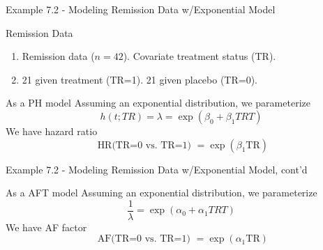 \documentclass{beamer}
\theoremstyle{definition}
\begin{document}
\begin{frame}{Example 7.2 - Modeling Remission Data w/Exponential Model}
\begin{block}{Remission Data}
\begin{enumerate}[ ]
\item Remission data ($n=42$). Covariate treatment status (TR).
\item 21 given treatment (TR=1). 21 given placebo (TR=0).
\end{enumerate}
\end{block}
\begin{block}{As a PH model}
Assuming an exponential distribution, we parameterize
\[ h(t;TR)= \lambda = \exp(\beta_0 + \beta_1 TRT)
\]
We have hazard ratio
\[
\text{ HR(TR=0 vs. TR=1) } = \exp(\beta_1 \text{TR})
\]
 \end{block}
 \end{frame}

 \begin{frame}{Example 7.2 - Modeling Remission Data w/Exponential Model, cont'd}

\begin{block}{As a AFT model}
Assuming an exponential distribution, we parameterize
\[ \frac{1}{\lambda} = \exp(\alpha_0 + \alpha_1 TRT)
\]
We have AF factor
\[
\text{ AF(TR=0 vs. TR=1) } = \exp(\alpha_1 \text{TR})
\]
 \end{block}
 \end{frame}
\end{document}
